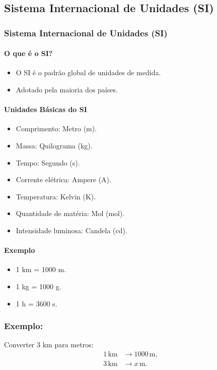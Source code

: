 \documentclass[12pt]{beamer}
\begin{document}
\begin{frame}
    \section{Sistema Internacional de Unidades (SI)}
    \frametitle{Sistema Internacional de Unidades (SI)}
    \framesubtitle{O que é o SI?}
    \begin{itemize}
        \item O SI é o padrão global de unidades de medida.
        \item Adotado pela maioria dos países.
    \end{itemize}

    \framesubtitle{Unidades Básicas do SI}
    \begin{itemize}
        \item Comprimento: Metro (m).
        \item Massa: Quilograma (kg).
        \item Tempo: Segundo (s).
        \item Corrente elétrica: Ampere (A).
        \item Temperatura: Kelvin (K).
        \item Quantidade de matéria: Mol (mol).
        \item Intensidade luminosa: Candela (cd).
    \end{itemize}

    \framesubtitle{Exemplo}
    \begin{itemize}
        \item 1 km = 1000 m.
        \item 1 kg = 1000 g.
        \item 1 h = 3600 s.
    \end{itemize}
\end{frame}
\begin{frame}
    \frametitle{Exemplo:}
    Converter 3 km para metros: 
    \begin{align*}
        1 \, \text{km} & \rightarrow 1000 \, \text{m}, \\
        3 \, \text{km} & \rightarrow x \, \text{m}. \\
        \\
        \\
    \phantom{} \\ %
    \phantom{} \\ %
    \phantom{} \\ %
    \phantom{} \\ %
    \end{align*}
\end{frame}
\end{document}
